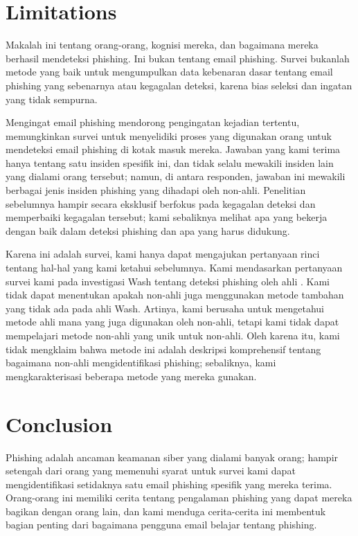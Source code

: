 \documentclass[lettersize,journal]{IEEEtran}
\begin{document}
\section{Limitations}
Makalah ini tentang orang-orang, kognisi mereka, dan bagaimana mereka berhasil
mendeteksi phishing. Ini bukan tentang email phishing. Survei bukanlah metode
yang baik untuk mengumpulkan data kebenaran dasar tentang email phishing yang
sebenarnya atau kegagalan deteksi, karena bias seleksi dan ingatan yang tidak
sempurna.

Mengingat email phishing mendorong pengingatan kejadian tertentu, memungkinkan
survei untuk menyelidiki proses yang digunakan orang untuk mendeteksi email
phishing di kotak masuk mereka. Jawaban yang kami terima hanya tentang satu
insiden spesifik ini, dan tidak selalu mewakili insiden lain yang dialami orang
tersebut; namun, di antara responden, jawaban ini mewakili berbagai jenis
insiden phishing yang dihadapi oleh non-ahli. Penelitian sebelumnya hampir
secara eksklusif berfokus pada kegagalan deteksi dan memperbaiki kegagalan
tersebut; kami sebaliknya melihat apa yang bekerja dengan baik dalam deteksi
phishing dan apa yang harus didukung.

Karena ini adalah survei, kami hanya dapat mengajukan pertanyaan rinci tentang
hal-hal yang kami ketahui sebelumnya. Kami mendasarkan pertanyaan survei kami
pada investigasi Wash tentang deteksi phishing oleh ahli \cite{tigaempat}. Kami
tidak dapat menentukan apakah non-ahli juga menggunakan metode tambahan yang
tidak ada pada ahli Wash. Artinya, kami berusaha untuk mengetahui metode ahli
mana yang juga digunakan oleh non-ahli, tetapi kami tidak dapat mempelajari
metode non-ahli yang unik untuk non-ahli. Oleh karena itu, kami tidak mengklaim
bahwa metode ini adalah deskripsi komprehensif tentang bagaimana non-ahli
mengidentifikasi phishing; sebaliknya, kami mengkarakterisasi beberapa metode
yang mereka gunakan.

\section{Conclusion}
Phishing adalah ancaman keamanan siber yang dialami banyak orang; hampir
setengah dari orang yang memenuhi syarat untuk survei kami dapat
mengidentifikasi setidaknya satu email phishing spesifik yang mereka terima.
Orang-orang ini memiliki cerita tentang pengalaman phishing yang dapat mereka
bagikan dengan orang lain, dan kami menduga cerita-cerita ini membentuk bagian
penting dari bagaimana pengguna email belajar tentang phishing.
\end{document}
